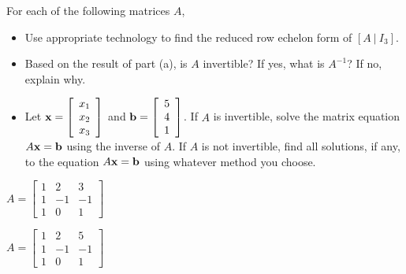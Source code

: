 \begin{example} For each of the following matrices $A$,
\begin{itemize}
\item Use appropriate technology to find the reduced row echelon form of $[A \ | \ I_3]$. 

\item Based on the result of part (a), is $A$ invertible? If yes, what is $A^{-1}$? If no, explain why.

\item Let $\mathbf{x} = \left[ \begin{array}{c} x_1\\x_2\\x_3 \end{array} \right]$ and $\mathbf{b} = \left[ \begin{array}{c} 5\\4\\1 \end{array} \right]$. If $A$ is invertible, solve the matrix equation $A \mathbf{x} = \mathbf{b}$ using the inverse of $A$. If $A$ is not invertible, find all solutions, if any, to the equation $A \mathbf{x} = \mathbf{b}$ using whatever method you choose. 
\end{itemize}

\ba
\item $A = \left[ \begin{array}{crr} 1&2&3 \\ 1&-1&-1 \\ 1&0&1 \end{array} \right]$
\item $A = \left[ \begin{array}{crr} 1&2&5 \\ 1&-1&-1 \\ 1&0&1 \end{array} \right]$
\ea


\end{example}
